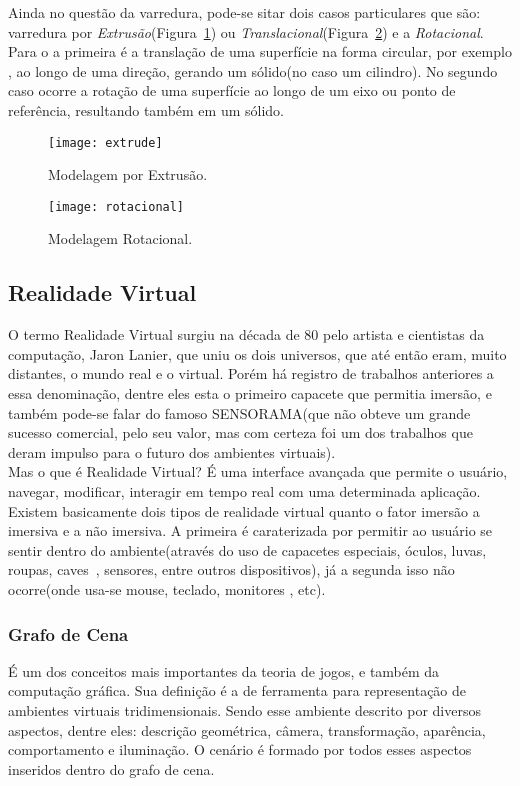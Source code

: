 Ainda no questão da varredura, pode-se sitar dois casos particulares que são: varredura por \textit{Extrusão}(Figura~\ref{fg:etrusao}) ou \textit{Translacional}(Figura~\ref{fg:rotacional}) e a \textit{Rotacional}. Para o a primeira é a translação de uma superfície na forma circular, por exemplo , ao longo de uma direção, gerando um sólido(no caso um cilindro). No segundo caso ocorre a rotação de uma superfície ao longo de um eixo ou ponto de referência, resultando também em um sólido.

\begin{figure}[ht!]
	\centering
	\texttt{[image: extrude]}
	\caption{Modelagem por Extrusão.}
	\label{fg:etrusao}
\end{figure} 
\begin{figure}[ht!]
	\centering
	\texttt{[image: rotacional]}
	\caption{Modelagem Rotacional.}
	\label{fg:rotacional}
\end{figure} 

\subsection{Realidade Virtual}
O termo Realidade Virtual surgiu na década de 80 pelo artista e cientistas da computação, Jaron Lanier, que uniu os dois universos, que até então eram, muito distantes, o mundo real e o virtual\cite{jane}. Porém há registro de trabalhos anteriores a essa denominação, dentre eles esta o primeiro capacete que permitia imersão, e também pode-se falar do famoso SENSORAMA\cite{rhen}(que não obteve um grande sucesso comercial, pelo seu valor, mas com certeza foi um dos trabalhos que deram impulso para o futuro dos ambientes virtuais).\\

Mas o que é Realidade Virtual? É uma interface avançada que permite o usuário, navegar, modificar, interagir em tempo real com uma determinada aplicação. Existem basicamente dois tipos de realidade virtual quanto o fator imersão a imersiva e a não imersiva. A primeira é caraterizada por permitir ao usuário se sentir dentro do ambiente(através do uso de capacetes especiais, óculos, luvas, roupas, caves~\cite{cave}, sensores, entre outros dispositivos), já a segunda isso não ocorre(onde usa-se mouse, teclado, monitores , etc)\cite{aect}.

\subsubsection{Grafo de Cena}
É um dos conceitos mais importantes da teoria de jogos, e também da computação gráfica. Sua definição é a de ferramenta para representação de ambientes virtuais tridimensionais. Sendo esse ambiente descrito por diversos aspectos, dentre eles: descrição geométrica, câmera, transformação, aparência, comportamento e iluminação\cite{ferreira}. O cenário é formado por todos esses aspectos inseridos dentro do grafo de cena. \\

